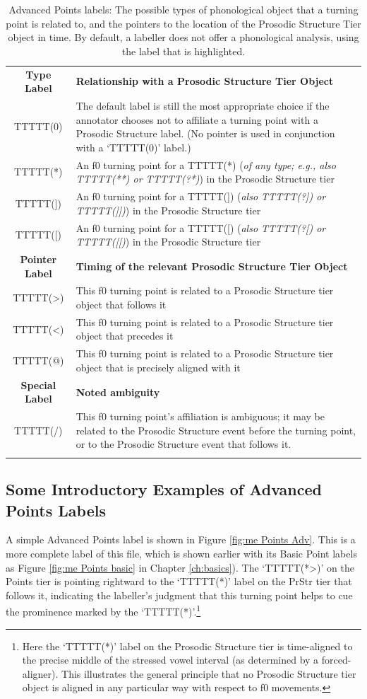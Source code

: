 \documentclass[11pt, twoside]{memoir}
\begin{document}
\begin{longtable}{cp{.8\linewidth}}
\toprule
\textbf{Type Label} & \textbf{Relationship with a Prosodic Structure Tier Object}\tabularnewline\hdashline
TTTTT(0) & The default label is still the most appropriate choice if the annotator chooses not to affiliate a turning point with a Prosodic Structure label. (No pointer is used in conjunction with a ‘TTTTT(0)’ label.) \tabularnewline\hdashline
TTTTT(*) & An f0 turning point for a TTTTT(*) (\textit{of any type; e.g., also TTTTT(**) or TTTTT(?*)}) in the Prosodic Structure tier \tabularnewline\hdashline
TTTTT(]) & An f0 turning point for a TTTTT(]) (\textit{also TTTTT(?]) or TTTTT(]])}) in the Prosodic Structure tier \tabularnewline\hdashline
TTTTT([) & An f0 turning point for a TTTTT([) (\textit{also TTTTT(?[) or TTTTT([[)}) in the Prosodic Structure tier \tabularnewline
\midrule
\textbf{Pointer Label} & \textbf{Timing of the relevant Prosodic Structure Tier Object}\tabularnewline\hdashline
TTTTT(>{}) & This f0 turning point is related to a Prosodic Structure tier object that follows it \tabularnewline\hdashline
TTTTT(<{}) & This f0 turning point is related to a Prosodic Structure tier object that precedes it \tabularnewline\hdashline
TTTTT(@) & This f0 turning point is related to a Prosodic Structure tier object that is precisely aligned with it \tabularnewline
\midrule
\textbf{Special Label} & \textbf{Noted ambiguity} \tabularnewline\hdashline
TTTTT(/) & This f0 turning point’s affiliation is ambiguous; it may be related to the Prosodic Structure event before the turning point, or to the Prosodic Structure event that follows it. \tabularnewline
\bottomrule
\caption[Advanced Points labels]{Advanced Points labels: The possible types of phonological object that a turning point is related to, and the pointers to the location of the Prosodic Structure Tier object in time. By default, a labeller does not offer a phonological analysis, using the label that is highlighted.}
\end{longtable}

\subsection{Some Introductory Examples of Advanced Points Labels}\label{sec:some-first-examples-of-advanced-points-labels}

A simple Advanced Points label is shown in Figure \ref{fig:me Points Adv}. This is a more complete label of this file, which is shown earlier with its Basic Point labels as Figure \ref{fig:me Points basic} in Chapter \ref{ch:basics}). The ‘TTTTT(*>)’ on the Points tier is pointing rightward to the ‘TTTTT(*)’ label on the PrStr tier that follows it, indicating the labeller’s judgment that this turning point helps to cue the prominence marked by the ‘TTTTT(*)’.\footnote{Here the ‘TTTTT(*)’ label on the Prosodic Structure tier is time-aligned to the precise middle of the stressed vowel interval (as determined by a forced-aligner). This illustrates the general principle that no Prosodic Structure tier object is aligned in any particular way with respect to f0 movements.}
\end{document}

